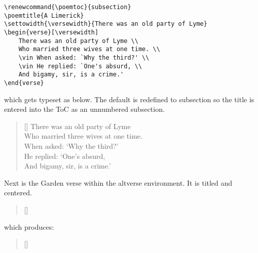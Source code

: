 \begin{lstlisting}[language={[common]TeX},% 
                           alsolanguage={[LaTeX]TeX},% 
                           alsolanguage={[primitive]TeX},%
                           alsolanguage={Verse}]
\renewcommand{\poemtoc}{subsection}
\poemtitle{A Limerick}
\settowidth{\versewidth}{There was an old party of Lyme}
\begin{verse}[\versewidth]
    There was an old party of Lyme \\
    Who married three wives at one time. \\
    \vin When asked: `Why the third?' \\
    \vin He replied: `One's absurd, \\
    And bigamy, sir, is a crime.'
\end{verse}
\end{lstlisting}

\begin{multicols}{2}
which gets typeset as below. The default   is redefined to subsection so
the title is entered into the ToC as an unnumbered subsection.

\newlength{\aaaa}
\settowidth{\aaaa}{ZZZZ}

\renewcommand{\poemtoc}{subsection}
\settowidth{\versewidth}{There was an old party of Lyme}
\begin{verse}[\versewidth]
    There was an old party of Lyme \\
     Who married three wives at one time. \\
    \vin When asked: `Why the third?' \\
    \ZZZZ He replied: `One's absurd, \\
And bigamy, sir, is a crime.'
\end{verse}

Next is the Garden verse within the altverse environment. It is titled and
centered.

\settowidth{\versewidth}{But now my love is dead}
\begin{verse}[\versewidth]
\begin{altverse}
\garden
\end{altverse}
\end{verse}


which produces:

\settowidth{\versewidth}{But now my love is dead}
\begin{verse}[\versewidth]
    \begin{altverse}
    \garden
\end{altverse}
\end{verse}
\end{multicols}

